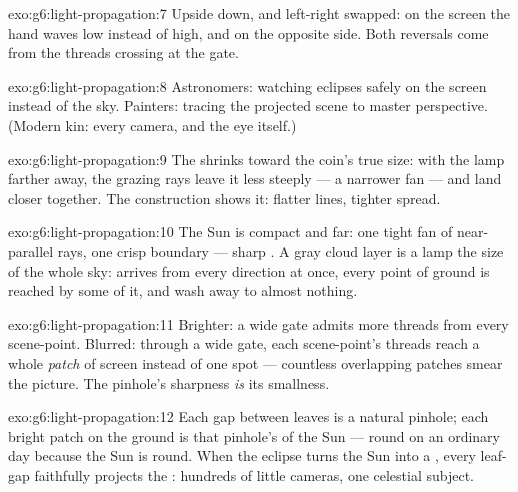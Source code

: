 \begin{solution}{exo:g6:light-propagation:7}
Upside down, and left-right swapped: on the screen the hand waves
low instead of high, and on the opposite side. Both reversals come
from the threads crossing at the gate.
\end{solution}

\begin{solution}{exo:g6:light-propagation:8}
Astronomers: watching eclipses safely on the screen instead of the
sky. Painters: tracing the projected scene to master perspective.
(Modern kin: every camera, and the eye itself.)
\end{solution}

\begin{solution}{exo:g6:light-propagation:9}
The  shrinks toward the coin's true size: with the lamp
farther away, the grazing rays leave it less steeply --- a
narrower fan --- and land closer together. The construction shows
it: flatter lines, tighter spread.
\end{solution}

\begin{solution}{exo:g6:light-propagation:10}
The Sun is compact and far: one tight fan of near-parallel rays,
one crisp boundary --- sharp . A gray cloud layer is a lamp
the size of the whole sky:  arrives from every direction at
once, every point of ground is reached by some of it, and 
wash away to almost nothing.
\end{solution}

\begin{solution}{exo:g6:light-propagation:11}
Brighter: a wide gate admits more threads from every scene-point.
Blurred: through a wide gate, each scene-point's threads reach a
whole \emph{patch} of screen instead of one spot --- countless
overlapping patches smear the picture. The pinhole's sharpness
\emph{is} its smallness.
\end{solution}

\begin{solution}{exo:g6:light-propagation:12}
Each gap between leaves is a natural pinhole; each bright patch on
the ground is that pinhole's  of the Sun --- round on an
ordinary day because the Sun is round. When the eclipse turns the
Sun into a , every leaf-gap faithfully projects the
: hundreds of little cameras, one celestial subject.
\end{solution}

